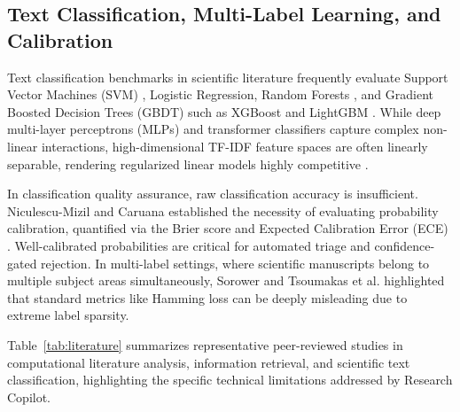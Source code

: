 \documentclass[journal]{IEEEtran}
\begin{document}
\subsection{Text Classification, Multi-Label Learning, and Calibration}
Text classification benchmarks in scientific literature frequently evaluate Support Vector Machines (SVM) \cite{cortes1995support}, Logistic Regression, Random Forests \cite{breiman2001random}, and Gradient Boosted Decision Trees (GBDT) such as XGBoost \cite{chen2016xgboost} and LightGBM \cite{ke2017lightgbm}. While deep multi-layer perceptrons (MLPs) and transformer classifiers capture complex non-linear interactions, high-dimensional TF-IDF feature spaces are often linearly separable, rendering regularized linear models highly competitive \cite{patel2024interpretability}.

In classification quality assurance, raw classification accuracy is insufficient. Niculescu-Mizil and Caruana \cite{niculescu2005predicting} established the necessity of evaluating probability calibration, quantified via the Brier score \cite{brier1950verification} and Expected Calibration Error (ECE) \cite{guo2017calibration}. Well-calibrated probabilities are critical for automated triage and confidence-gated rejection. In multi-label settings, where scientific manuscripts belong to multiple subject areas simultaneously, Sorower \cite{sorower2010literature} and Tsoumakas et al. \cite{tsoumakas2007multi} highlighted that standard metrics like Hamming loss can be deeply misleading due to extreme label sparsity.

Table~\ref{tab:literature} summarizes representative peer-reviewed studies in computational literature analysis, information retrieval, and scientific text classification, highlighting the specific technical limitations addressed by Research Copilot.
\end{document}
